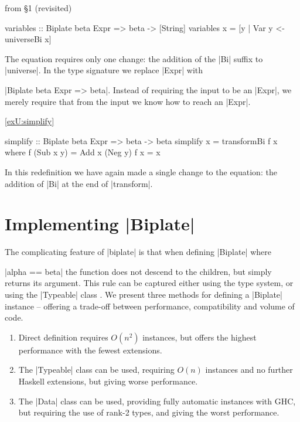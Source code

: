 \begin{exampleany}{from \S1 (revisited)}
\begin{code}
variables :: Biplate beta Expr => beta -> [String]
variables x = [y | Var y <- universeBi x]
\end{code}

The equation requires only one change: the addition of the |Bi| suffix to |universe|. In the type signature we replace |Expr| with \ignore|Biplate beta Expr => beta|. Instead of requiring the input to be an |Expr|, we merely require that from the input we know how to reach an |Expr|.
\end{exampleany}

\begin{examplerevisit}{\ref{exU:simplify}}
\begin{code}
simplify :: Biplate beta Expr => beta -> beta
simplify x = transformBi f x
    where  f (Sub x y)  = Add x (Neg y)
           f x          = x
\end{code}

In this redefinition we have again made a single change to the equation: the addition of |Bi| at the end of |transform|.
\end{examplerevisit}

\section{Implementing |Biplate|}
\label{secU:implement_playex}

The complicating feature of |biplate| is that when defining |Biplate| where \ignore|alpha == beta| the function does not descend to the children, but simply returns its argument. This rule can be captured either using the type system, or using the |Typeable| class \cite{lammel:syb}. We present three methods for defining a |Biplate| instance -- offering a trade-off between performance, compatibility and volume of code.

\begin{enumerate}
\item Direct definition requires $O(n^2)$ instances, but offers the highest performance with the fewest extensions.
\item The |Typeable| class can be used, requiring $O(n)$ instances and no further Haskell extensions, but giving worse performance.
\item The |Data| class can be used, providing fully automatic instances with GHC, but requiring the use of rank-2 types, and giving the worst performance.
\end{enumerate}


